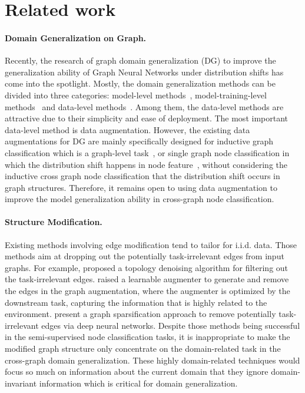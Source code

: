 \section{Related work}
\paragraph{Domain Generalization on Graph.}
Recently, the research of graph domain generalization (DG) to improve the generalization ability of Graph Neural Networks under distribution shifts has come into the spotlight.
Mostly, the domain generalization methods can be divided into three categories\cite{li2022out}:
model-level methods~\cite{li2021disentangled,li2022ood}, model-training-level methods~\cite{liu2022confidence,wu2022discovering} and data-level methods~\cite{rongdropedge,you2020graph}. Among them, the data-level methods are attractive  due to their simplicity and ease of deployment. The most important data-level method is data augmentation.
However, the existing data augmentations for DG are mainly specifically designed for inductive graph classification which is a graph-level task~\cite{kong2020flag}, or single graph node classification in which the distribution shift happens in node feature~\cite{park2021metropolis}, without considering the inductive cross graph node classification that the distribution shift occurs in graph structures. Therefore, it remains open to using data augmentation to improve the model generalization ability in cross-graph node classification.


\paragraph{Structure Modification.}
Existing methods involving edge modification tend to tailor for i.i.d. data. Those methods aim at dropping out the potentially
task-irrelevant edges from input graphs. For example, \citet{luo2021learning} proposed a topology denoising algorithm for filtering out the task-irrelevant edges. \citet{zhao2021data} raised a 
 learnable augmenter to generate and remove the edges in the graph augmentation, where the augmenter is  optimized by the downstream task, capturing the information that is highly related to 
the environment. \citet{zheng2020robust} present a graph sparsification approach to remove potentially task-irrelevant edges via deep neural networks. Despite those methods being successful in the semi-supervised node classification tasks,
it is inappropriate to make the modified graph structure only concentrate on the domain-related task in the cross-graph domain generalization. 
These highly domain-related techniques  would focus so much on information about the current domain that they ignore domain-invariant information which is critical for domain generalization.



